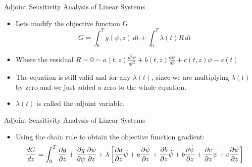 \documentclass[10pt]{beamer}
\begin{document}
\begin{frame}{Adjoint Sensitivity Analysis of Linear Systems}
	\begin{itemize}
		\item  Lets modify the objective function G
		\begin{equation}
G =  \int^{T}_0  g(\psi,z) \, dt + \int^{T}_0 \lambda(t) R \, dt 
		\end{equation}
		\item Where the residual $R = 0 =  a(t,z)\frac{d^2 \psi}{dt^2} + b(t,z)\frac{d \psi}{dt} +c(t,z) \psi- s(t) $
		\item The  equation is still valid and for any $\lambda(t)$, since we are multiplying $\lambda(t)$ by zero and we just added a zero to the whole equation. 
		\item $\lambda(t)$ is called the adjoint variable.
	\end{itemize}
\end{frame}

\begin{frame}{Adjoint Sensitivity Analysis of Linear Systems}
	\begin{itemize}
		\item Using the chain rule to obtain the objective function gradient:
		\begin{dmath}
\frac{dG}{dz} = \int^T_0 \frac{\partial g}{\partial z}
+ \frac{\partial g}{\partial \psi} \frac{\partial \psi}{\partial z} + \lambda \left[  \frac{\partial a}{\partial z} \ddot{\psi} + \\ a \frac{\partial \ddot{\psi}}{\partial z} + \frac{\partial b}{\partial z} \dot{\psi} + b \frac{\partial \dot{\psi}}{\partial z} + \frac{\partial c}{\partial z} \psi + c \frac{\partial \psi}{\partial z}\right] 
		\end{dmath} 
	\end{itemize}
\end{frame}
\end{document}
